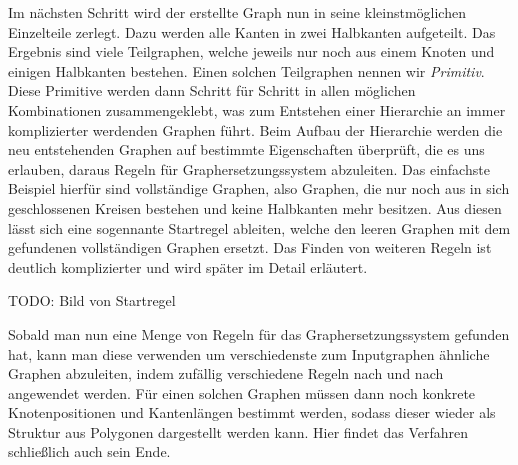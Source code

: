 Im nächsten Schritt wird der erstellte Graph nun in seine kleinstmöglichen Einzelteile zerlegt. Dazu werden alle Kanten in zwei Halbkanten
aufgeteilt. Das Ergebnis sind viele Teilgraphen, welche jeweils nur noch aus einem Knoten und einigen Halbkanten bestehen. Einen solchen Teilgraphen
nennen wir \textit{Primitiv}. Diese Primitive werden dann Schritt für Schritt in allen möglichen Kombinationen zusammengeklebt, was zum Entstehen
einer Hierarchie an immer komplizierter werdenden Graphen führt. Beim Aufbau der Hierarchie werden die neu entstehenden Graphen auf bestimmte
Eigenschaften überprüft, die es uns erlauben, daraus Regeln für Graphersetzungssystem abzuleiten. Das einfachste Beispiel hierfür sind
vollständige Graphen, also Graphen, die nur noch aus in sich geschlossenen Kreisen bestehen und keine Halbkanten mehr besitzen. Aus diesen lässt
sich eine sogennante Startregel ableiten, welche den leeren Graphen mit dem gefundenen vollständigen Graphen ersetzt. Das Finden von weiteren
Regeln ist deutlich komplizierter und wird später im Detail erläutert.

TODO: Bild von Startregel

Sobald man nun eine Menge von Regeln für das Graphersetzungssystem gefunden hat, kann man diese verwenden um verschiedenste zum Inputgraphen
ähnliche Graphen abzuleiten, indem zufällig verschiedene Regeln nach und nach angewendet werden. Für einen solchen Graphen müssen dann noch
konkrete Knotenpositionen und Kantenlängen bestimmt werden, sodass dieser wieder als Struktur aus Polygonen dargestellt werden kann. Hier
findet das Verfahren schließlich auch sein Ende.